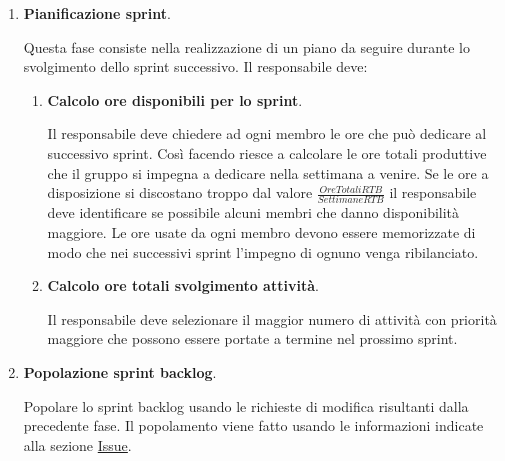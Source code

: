 \begin{enumerate}
    \item \textbf{Pianificazione sprint}.
    
    Questa fase consiste nella realizzazione di un piano da seguire durante lo svolgimento dello sprint successivo.
    Il responsabile deve:
    \begin{enumerate}
        \item \textbf{Calcolo ore disponibili per lo sprint}.
        
        Il responsabile deve chiedere ad ogni  membro le ore che può dedicare al successivo sprint.
        Così facendo riesce a calcolare le ore totali produttive che il gruppo si impegna a dedicare nella settimana a venire.
        Se le ore a disposizione si discostano troppo dal valore $\frac{Ore Totali RTB}{Settimane RTB}$ il responsabile deve identificare se possibile alcuni membri che danno disponibilità maggiore.
        Le ore usate da ogni membro devono essere memorizzate di modo che nei successivi sprint l'impegno di ognuno venga ribilanciato.

        \item \textbf{Calcolo ore totali svolgimento attività}.
        
        Il responsabile deve selezionare il maggior numero di attività con priorità maggiore che possono essere portate a termine nel prossimo sprint.
    \end{enumerate}

    \item \textbf{Popolazione sprint backlog}.
    
    Popolare lo sprint backlog usando le richieste di modifica risultanti dalla precedente fase.
    Il popolamento viene fatto usando le informazioni indicate alla sezione \hyperref[subpar:ITS]{Issue}.
\end{enumerate}

